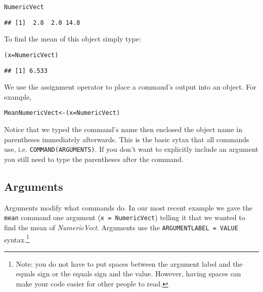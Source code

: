 \begin{knitrout}
\color{fgcolor}\begin{kframe}
\begin{alltt}
NumericVect
\end{alltt}
\begin{verbatim}
## [1]  2.8  2.0 14.8
\end{verbatim}
\end{kframe}
\end{knitrout}


\noindent To find the mean of this object simply type:

\begin{knitrout}
\color{fgcolor}\begin{kframe}
\begin{alltt}
(x = NumericVect)
\end{alltt}
\begin{verbatim}
## [1] 6.533
\end{verbatim}
\end{kframe}
\end{knitrout}


\noindent We use the assignment operator to place a command's output into an object. For example,

\begin{knitrout}
\color{fgcolor}\begin{kframe}
\begin{alltt}
MeanNumericVect <- (x = NumericVect)
\end{alltt}
\end{kframe}
\end{knitrout}


\noindent Notice that we typed the command's name then enclosed the object name in parentheses immediately afterwards. This is the basic sytax that all commands use, i.e. \texttt{COMMAND(ARGUMENTS)}. If you don't want to explicitly include an argument you still need to type the parentheses after the command. 

\subsection{Arguments}

Arguments modify what commands do. In our most recent example we gave the \texttt{mean} command one argument (\texttt{x = NumericVect}) telling it that we wanted to find the mean of {\emph{NumericVect}}. Arguments use the \texttt{ARGUMENTLABEL = VALUE} syntax.\footnote{Note: you do not have to put spaces between the argument label and the equals sign or the equals sign and the value. However, having spaces can make your code easier for other people to read.} 

